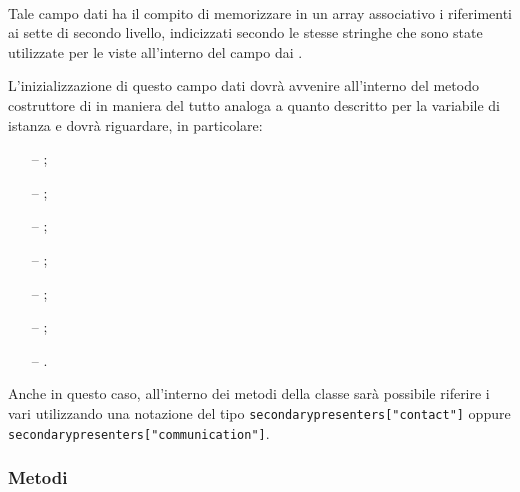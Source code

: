 \begin{description}
  \item{}\\
Tale campo dati ha il compito di memorizzare in un array associativo i riferimenti ai sette  di secondo livello, indicizzati secondo le stesse stringhe che sono state utilizzate per le viste all'interno del campo dai .

L'inizializzazione di questo campo dati dovrà avvenire all'interno del metodo costruttore di  in maniera del tutto analoga a quanto descritto per la variabile di istanza  e dovrà riguardare, in particolare:
\begin{itemize}
  \item[--] ; 
  \item[--] ; 
  \item[--] ; 
  \item[--] ;
  \item[--] ;
  \item[--] ;
  \item[--] .
\end{itemize}

Anche in questo caso, all'interno dei metodi della classe sarà possibile riferire i vari  utilizzando una notazione del tipo \verb'secondarypresenters["contact"]' oppure \verb'secondarypresenters["communication"]'.
  
\end{description}

\subsubsection*{Metodi}

